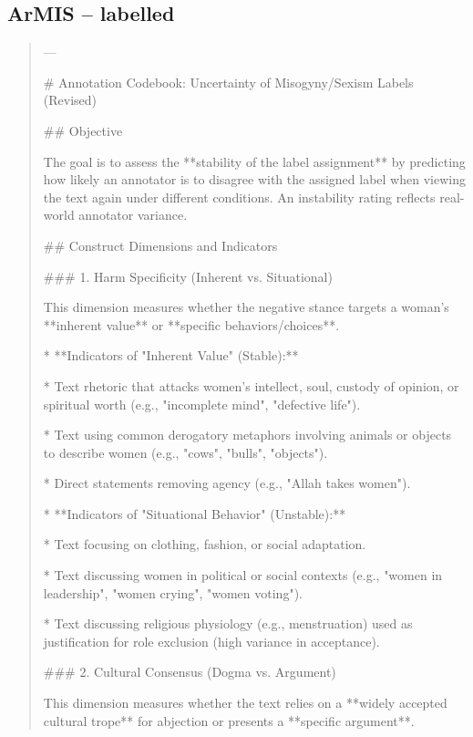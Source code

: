 \subsection*{ArMIS -- labelled}
\begin{quote}\small
---

# Annotation Codebook: Uncertainty of Misogyny/Sexism Labels (Revised)



## Objective

The goal is to assess the **stability of the label assignment** by predicting how likely an annotator is to disagree with the assigned label when viewing the text again under different conditions. An instability rating reflects real-world annotator variance.



## Construct Dimensions and Indicators



### 1. Harm Specificity (Inherent vs. Situational)

This dimension measures whether the negative stance targets a woman's **inherent value** or **specific behaviors/choices**.



*   **Indicators of "Inherent Value" (Stable):**

    *   Text rhetoric that attacks women's intellect, soul, custody of opinion, or spiritual worth (e.g., "incomplete mind", "defective life").

    *   Text using common derogatory metaphors involving animals or objects to describe women (e.g., "cows", "bulls", "objects").

    *   Direct statements removing agency (e.g., "Allah takes women").

*   **Indicators of "Situational Behavior" (Unstable):**

    *   Text focusing on clothing, fashion, or social adaptation.

    *   Text discussing women in political or social contexts (e.g., "women in leadership", "women crying", "women voting").

    *   Text discussing religious physiology (e.g., menstruation) used as justification for role exclusion (high variance in acceptance).



### 2. Cultural Consensus (Dogma vs. Argument)

This dimension measures whether the text relies on a **widely accepted cultural trope** for abjection or presents a **specific argument**.




\end{quote}
